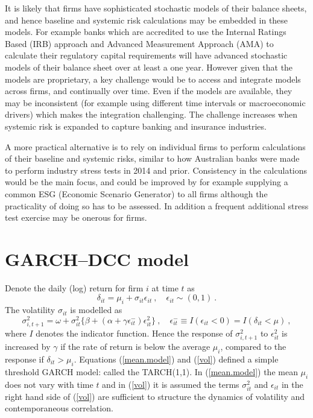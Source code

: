 \documentclass[authoryear]{elsarticle}
\newcommand{\eps}{\epsilon}
\newcommand{\cq}{\ ,\quad }
\newcommand{\be}[1]{\begin{equation}\label{#1}}
\newcommand{\ee}{\end{equation}}
\newcommand{\eref}[1]{(\ref{#1})}
\begin{document}
It is likely that firms have sophisticated stochastic models of their balance sheets, and hence baseline and systemic risk calculations may be embedded in these models. For example banks which are accredited to use the Internal Ratings Based (IRB) approach and Advanced Measurement Approach (AMA) to calculate their regulatory capital requirements will have advanced stochastic models of their balance sheet over at least a one year. However given that the models are proprietary, a key challenge would be to access and integrate models across firms, and continually over time. Even if the models are available, they may be inconsistent (for example using different time intervals or macroeconomic drivers) which makes the integration challenging. The challenge increases when systemic risk is expanded to capture banking and insurance industries.

A more practical alternative is to rely on individual firms to perform calculations of their baseline and systemic risks, similar to how Australian banks were made to perform industry stress tests in 2014 and prior. Consistency in the calculations would be the main focus, and could be improved by for example supplying a common ESG (Economic Scenario Generator) to all firms although the practicality of doing so has to be assessed. In addition a frequent additional stress test exercise may be onerous for firms.




\newpage





\appendix
\renewcommand*{\thesection}{\Alph{section}}

\section{GARCH--DCC model}\label{garchdcc}

Denote the daily (log) return for firm $i$ at time $t$ as
\newcommand{\vareps}{\varepsilon}
\be{mean.model}
\delta_{it}=\mu_i+\sigma_{it}\eps_{it}\cq \eps_{it}\sim (0,1)\ .
\ee
The volatility $\sigma_{it}$ is modelled as
\be{vol}
\sigma_{i,t+1}^2 = \omega+ \sigma^2_{it}\{\beta+(\alpha+\gamma \eps^-_{it})\eps_{it}^2\}  \cq  \eps^-_{it}\equiv I(\eps_{it}<0)=I(\delta_{it}<\mu)\ ,
\ee
where $I$ denotes the indicator function.  Hence the response of $\sigma_{i,t+1}^2$ to $\eps_{it}^2$  is increased by $\gamma$   if
the rate of return is below the average $\mu_i$, compared to the response if $\delta_{it}>\mu_i$.  Equations \eref{mean.model} and \eref{vol} defined a simple threshold GARCH model:  called the TARCH(1,1).   In \eref{mean.model} the mean $\mu_i$ does not vary with time $t$ and in \eref{vol} it is assumed the terms  $\sigma_{it}^2$ and $\eps_{it}$ in the right hand side of \eref{vol} are sufficient to structure the dynamics of volatility and contemporaneous correlation.
\end{document}
